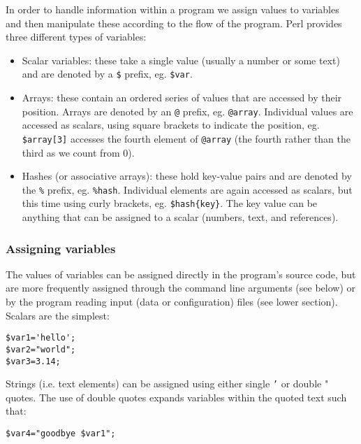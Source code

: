 \documentclass[11pt]{article}
\begin{document}
In order to handle information within a program we assign values to
variables and then manipulate these according to the flow of the
program. Perl provides three different types of variables:

\begin{itemize}
\item Scalar variables: these take a single value (usually a number or some text) 
and are denoted by a \texttt{\$} prefix, eg. \texttt{\$var}.

\item Arrays: these contain an ordered series of values that are accessed by their
position. Arrays are denoted by an \texttt{@} prefix, eg. \texttt{@array}.
Individual values are accessed as scalars, using square brackets to
indicate the position, eg. \texttt{\$array[3]} accesses the fourth element of
\texttt{@array} (the fourth rather than the third as we count from 0).

\item Hashes (or associative arrays): these hold key-value pairs and are
denoted by the \texttt{\%} prefix, eg. \texttt{\%hash}. Individual elements are again
accessed as scalars, but this time using curly brackets, eg.
\texttt{\$hash\{key\}}. The key value can be anything that can be assigned to a
scalar (numbers, text, and references).
\end{itemize}

\subsubsection{Assigning variables}
\label{sec-5-0-2}

The values of variables can be assigned directly in the program's source
code, but are more frequently assigned through the command line
arguments (see below) or by the program reading input (data or
configuration) files (see lower section). Scalars are the simplest:

\begin{verbatim}
$var1='hello'; 
$var2="world";
$var3=3.14;
\end{verbatim}

Strings (i.e. text elements) can be assigned using either single \texttt{’} or
double " quotes. The use of double quotes expands variables within the
quoted text such that:

\begin{verbatim}
$var4="goodbye $var1";
\end{verbatim}
\end{document}
